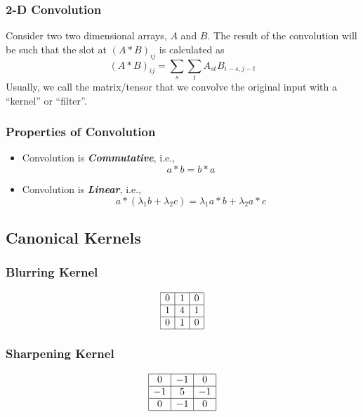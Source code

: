 \documentclass[11pt]{article}
\begin{document}
\subsubsection{2-D Convolution}
Consider two two dimensional arrays, $A$ and $B$. The result of the convolution will be such that the slot at $(A\ast B)_{ij}$ is calculated as
\begin{equation}
    (A * B)_{i j}=\sum_{s} \sum_{t} A_{s t} B_{i-s, j-t}
\end{equation}
Usually, we call the matrix/tensor that we convolve the original input with a ``kernel'' or ``filter''. 

\subsubsection{Properties of Convolution}
\begin{itemize}
    \item Convolution is \textit{\textbf{Commutative}}, i.e.,
        \begin{equation}
            a * b=b * a
        \end{equation} 
    \item Convolution is \textit{\textbf{Linear}}, i.e., 
        \begin{equation}
            a *\left(\lambda_{1} b+\lambda_{2} c\right)=\lambda_{1} a * b+\lambda_{2} a * c
        \end{equation}
\end{itemize}

\subsection{Canonical Kernels}
\subsubsection{Blurring Kernel}
\begin{equation}
    \begin{array}{|c|c|c|}
        \hline 0 & {1} & {0} \\
        \hline 1 & {4} & {1} \\
        \hline 0 & {1} & {0} \\
        \hline
    \end{array}
\end{equation}

\subsubsection{Sharpening Kernel}
\begin{equation}
    \begin{array}{|c|c|c|}
        \hline 0 & {-1} & {0} \\
        \hline -1 & {5} & {-1} \\
        \hline 0 & {-1} & {0} \\
        \hline
    \end{array}
\end{equation}
\end{document}
